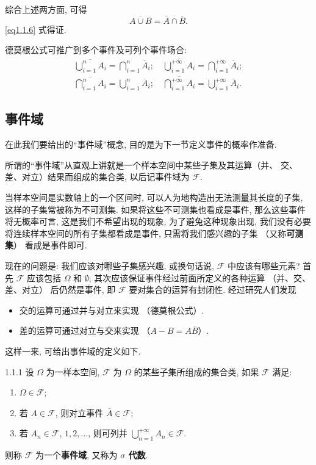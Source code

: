 综合上述两方面,
可得
\[
  \overline{A \cup B} = \overline{A} \cap \overline{B}.
\]
\eqref{eq1.1.6} 式得证.

德莫根公式可推广到多个事件及可列个事件场合:
\begin{gather}
  \overline{\bigcup _{i=1} ^n A _i} = \bigcap _{i=1} ^n \overline{A} _i;
  \quad \overline{\bigcup _{i=1} ^{+\infty} A _i} = \bigcap _{i=1} ^{+\infty} \overline{A} _i; \label{eq1.1.8}\\
  \overline{\bigcap _{i=1} ^n A _i} = \bigcup _{i=1} ^n \overline{A} _i;
  \quad \overline{\bigcap _{i=1} ^{+\infty} A _i} = \bigcup _{i=1} ^{+\infty} \overline{A} _i. \label{eq1.1.9}
\end{gather}

\subsection{事件域}

在此我们要给出的“事件域”概念,
目的是为下一节定义事件的概率作准备.

所谓的“事件域”从直观上讲就是一个样本空间中某些子集及其运算（并、 交、差、对立）结果而组成的集合类,
以后记事件域为 $\mathscr{F}$.

当样本空间是实数轴上的一个区间时,
可以人为地构造出无法测量其长度的子集,
这样的子集常被称为不可测集.
如果将这些不可测集也看成是事件,
那么这些事件将无概率可言,
这是我们不希望出现的现象,
为了避兔这种现象出现,
我们没有必要将连续样本空间的所有子集都看成是事件,
只需将我们感兴趣的子集 （又称\textbf{可测集}） 看成是事件即可.

现在的问题是:
我们应该对哪些子集感兴趣,
或换句话说,
$\mathscr{F}$ 中应该有哪些元素?
首先 $\mathscr{F}$ 应该包括 $\Omega$ 和 $\emptyset$;
其次应该保证事件经过前面所定义的各种运算 （并、交、差、对立） 后仍然是事件,
即 $\mathscr{F}$ 要对集合的运算有封闭性.
经过研究人们发现
\begin{itemize}
  \item 交的运算可通过并与对立来实现 （德莫根公式）.
  \item 差的运算可通过对立与交来实现 （$A - B = A\overline{B}$）.
\end{itemize}

这样一来,
可给出事件域的定义如下.


\begin{definition}{}{1.1.1}
  设 $ \Omega $ 为一样本空间,
  $\mathscr{F}$ 为 $\Omega$ 的某些子集所组成的集合类,
  如果 $\mathscr{F}$ 满足:
  \begin{enumerate}
      \item $\Omega \in \mathscr{F}$;
      \item 若 $A \in \mathscr{F}$, 则对立事件 $\overline{A} \in \mathscr{F}$;
      \item 若 $A _n \in \mathscr{F}$, $1,2,\dotsc$, 则可列并 $\bigcup _{n=1} ^{+\infty} A _n \in \mathscr{F}$.
  \end{enumerate}
  则称 $\mathscr{F}$ 为一个\textbf{事件域}, 
  又称为 \textbf{$\sigma$ 代数}. 
\end{definition}

